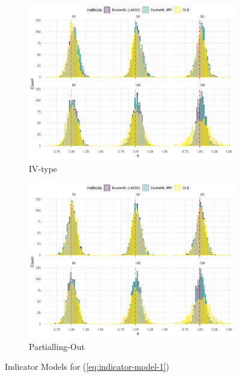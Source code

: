 \documentclass[en,12pt,mtpro2]{elegantpaper}
\begin{document}
\begin{figure}[htp]
    \centering
    \begin{subfigure}{.41\textwidth}
        \centering
        \includegraphics[width=\linewidth]{figures/simulation-indicator3 (IV-type).pdf}
        \caption{IV-type}
    \end{subfigure}
    \begin{subfigure}{.41\textwidth}
        \centering
        \includegraphics[width=\linewidth]{figures/simulation-indicator3 (partialling out).pdf}
        \caption{Partialling-Out}
    \end{subfigure}
    \caption{Indicator Models for (\ref{eq:indicator-model-1})}
\end{figure}
\end{document}
